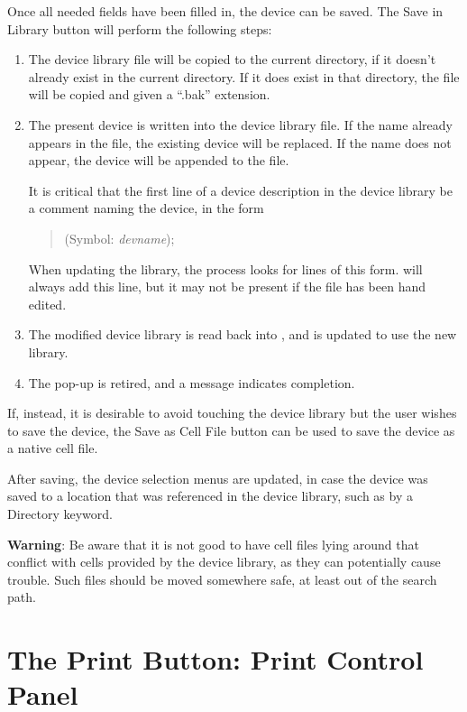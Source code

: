 Once all needed fields have been filled in, the device can be saved. 
The {\cb Save in Library} button will perform the following steps:
\begin{enumerate}
\item{The device library file will be copied to the current directory,
    if it doesn't already exist in the current directory.  If it does
    exist in that directory, the file will be copied and given a
    ``{\vt .bak}'' extension.}

\item{The present device is written into the device library file.  If
    the name already appears in the file, the existing device will be
    replaced.  If the name does not appear, the device will be
    appended to the file.

It is critical that the first line of a device description in the
device library be a comment naming the device, in the form
\begin{quote}
({\vt Symbol:} {\it devname});
\end{quote}
When updating the library, the process looks for lines of this form. 
{\Xic} will always add this line, but it may not be present if the
file has been hand edited.}

\item{The modified device library is read back into {\Xic}, and {\Xic}
    is updated to use the new library.}

\item{The pop-up is retired, and a message indicates completion.}
\end{enumerate}

If, instead, it is desirable to avoid touching the device library but
the user wishes to save the device, the {\cb Save as Cell File}
button can be used to save the device as a native cell file.

After saving, the device selection menus are updated, in case the
device was saved to a location that was referenced in the device
library, such as by a {\vt Directory} keyword.

{\bf Warning}:  Be aware that it is not good to have cell files lying
around that conflict with cells provided by the device library, as
they can potentially cause trouble.  Such files should be moved
somewhere safe, at least out of the search path.


\section{The {\cb Print} Button: Print Control Panel}

